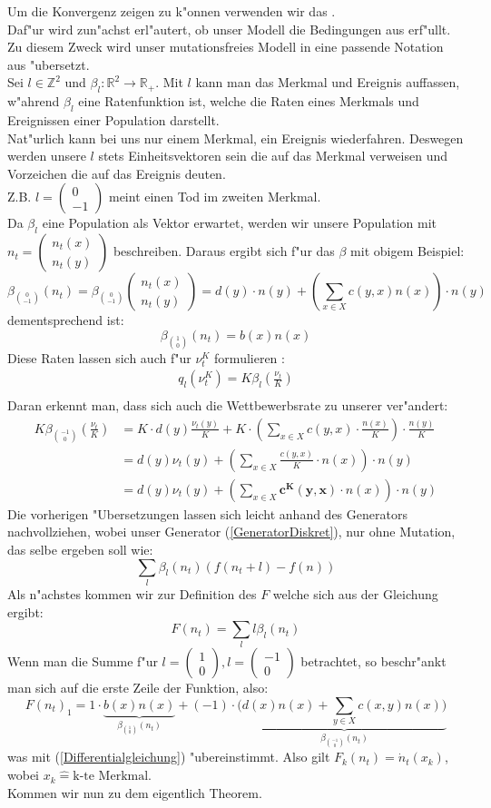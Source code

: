 \documentclass[11pt, a4paper, german]{article}
\theoremstyle{plain}
\newcommand{\tvec}[2]{\begin{pmatrix}#1\\#2\end{pmatrix}}
\begin{document}
	Um die Konvergenz zeigen zu k"onnen verwenden wir das \cite[Kapitel 11, Thm 2.1]{ethier2009markov}. \\
	Daf"ur wird zun"achst erl"autert, ob unser Modell die Bedingungen aus \cite{ethier2009markov} erf"ullt. Zu diesem Zweck wird unser mutationsfreies Modell in eine passende Notation aus \cite{ethier2009markov} "ubersetzt.\\
	Sei $ l \in \mathbb{Z}^2 $ und $ \beta_l : \mathbb{R}^2 \to \mathbb{R}_+ $. Mit $ l $ kann man das Merkmal und Ereignis auffassen, w"ahrend $ \beta_l $ eine Ratenfunktion ist, welche die Raten eines Merkmals und Ereignissen einer Population darstellt.\\
	Nat"urlich kann bei uns nur einem Merkmal, ein Ereignis wiederfahren. Deswegen werden unsere $ l $ stets Einheitsvektoren sein die auf das Merkmal verweisen und Vorzeichen die auf das Ereignis deuten.\\
	Z.B. $ l = \tvec{0}{-1} $ meint einen Tod im zweiten Merkmal.\\
	Da $ \beta_l $ eine Population als Vektor erwartet, werden wir unsere Population mit $ n_t = \tvec{n_t(x)}{n_t(y)} $ beschreiben. Daraus ergibt sich f"ur das $ \beta $ mit obigem Beispiel:
	\[ \beta_{\binom{0}{-1}}(n_t)  = \beta_{\binom{0}{-1}}\tvec{n_t(x)}{n_t(y)} = d(y) \cdot n(y) + \left(\sum_{x \in X} c(y,x)n(x)\right) \cdot n(y) \]
	dementsprechend ist:
	\[ \beta_{\binom{1}{0}}(n_t)  = b(x)n(x) \]
	Diese Raten lassen sich auch f"ur $ \nu_t^K $ formulieren \cite[Kapitel 11 - (1.12)]{ethier2009markov}:
	\begin{align*}
		q_l(\nu_t^K) = K\beta_l\left(\frac{\nu_t}{K}\right)\\
	\end{align*}
	Daran erkennt man, dass sich auch die Wettbewerbsrate zu unserer ver"andert:
	\begin{align*}
		K\beta_{\binom{-1}{0}}\left(\frac{\nu_t}{K}\right) &= K \cdot d(y)\frac{\nu_t(y)}{K} +  K \cdot \left(\sum_{x \in X} c(y,x) \cdot \frac{n(x)}{K}\right) \cdot \frac{n(y)}{K}\\
		&= d(y) \nu_t(y) + \left(\sum_{x \in X} \frac{c(y,x)}{K} \cdot n(x)\right) \cdot n(y)\\
		&= d(y) \nu_t(y) + \left(\sum_{x \in X} \bm{c^K(y,x)} \cdot n(x)\right) \cdot n(y)
	\end{align*}
	Die vorherigen "Ubersetzungen lassen sich leicht anhand des Generators nachvollziehen, wobei unser Generator (\ref{GeneratorDiskret}), nur ohne Mutation, das selbe ergeben soll wie: 
	\[ \sum_l \beta_l(n_t)(f(n_t + l) - f(n)) \]
	Als n"achstes kommen wir zur Definition des $ F $ welche sich aus der Gleichung \cite[Kapitel 6 - (2.2)]{ethier2009markov} ergibt:
	\[ F(n_t) = \sum_l l \beta_l (n_t) \]
	Wenn man die Summe f"ur $ l = \tvec{1}{0}, l = \tvec{-1}{0} $ betrachtet, so beschr"ankt man sich auf die erste Zeile der Funktion, also:
	\[ F(n_t)_1 = 1 \cdot \underbrace{b(x)n(x)}_{\beta_{\binom{1}{0}} (n_t)} +  (-1) \cdot ( \underbrace{d(x)n(x) + \sum_{y \in X} c(x,y)n(x))}_{\beta_{\binom{-1}{0}} (n_t)} \]
	was mit (\ref{Differentialgleichung}) "ubereinstimmt. Also gilt $ F_k(n_t) = \dot{n}_t(x_k) $, wobei $ x_k \hat{=} \text{k-te Merkmal} $.\\
	Kommen wir nun zu dem eigentlich Theorem.
	
\end{document}
